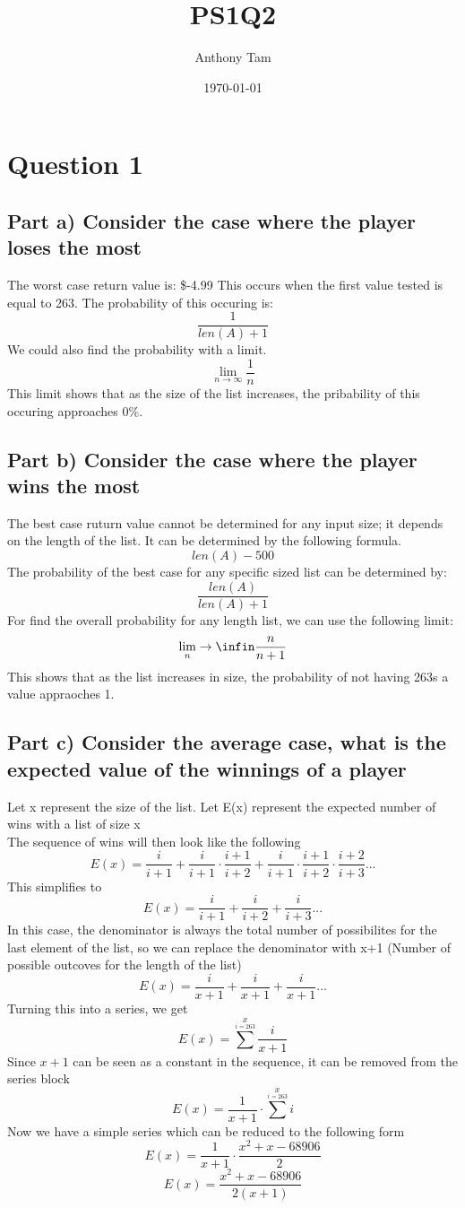 \documentclass[11pt]{article}
\author{Anthony Tam}
\date{\today}
\title{PS1Q2}
\begin{document}
\maketitle
\tableofcontents

\section{Question 1}
\label{sec-1}
\subsection{Part a) Consider the case where the player loses the most}
\label{sec-1-1}
The worst case return value is: \$-4.99
This occurs when the first value tested is equal to 263. The probability of this occuring is:
\[\frac{1}{len(A)+1}\]
We could also find the probability with a limit.
\[\lim_{n\to\infty} \frac{1}{n}\]
This limit shows that as the size of the list increases, the pribability of this occuring approaches 0\%.
\subsection{Part b) Consider the case where the player wins the most}
\label{sec-1-2}
The best case ruturn value cannot be determined for any input size; it depends on the length of the list. It can be determined by the following formula.
\[len(A) - 500\]
The probability of the best case for any specific sized list can be determined by:
\[\frac{len(A)}{len(A) + 1}\]
For find the overall probability for any length list, we can use the following limit:
\[\lim_n\rightarrow\infin \frac{n}{n+1}\]
This shows that as the list increases in size, the probability of not having 263s a value appraoches 1.
\subsection{Part c) Consider the average case, what is the expected value of the winnings of a player}
\label{sec-1-3}
Let x represent the size of the list. Let E(x) represent the expected number of wins with a list of size x\\
   The sequence of wins will then look like the following
\[E(x) = \frac{i}{i+1} + \frac{i}{i+1}\cdot\frac{i+1}{i+2} + \frac{i}{i+1}\cdot\frac{i+1}{i+2}\cdot\frac{i+2}{i+3} ...\]
This simplifies to
\[E(x) = \frac{i}{i+1} + \frac{i}{i+2} + \frac{i}{i+3} ...\]
In this case, the denominator is always the total number of possibilites for the last element of the list, so we can replace the denominator with x+1 (Number of possible outcoves for the length of the list)
\[E(x) = \frac{i}{x+1} + \frac{i}{x+1} + \frac{i}{x+1} ...\]
Turning this into a series, we get
\[E(x) = \sum^{x}\limits_{i=263} \frac{i}{x+1}\]
Since $x+1$ can be seen as a constant in the sequence, it can be removed from the series block
\[E(x) = \frac{1}{x+1}\cdot\sum^{x}\limits_{i=263} i\]
Now we have a simple series which can be reduced to the following form
\[E(x) = \frac{1}{x+1}\cdot\frac{x^2+x-68906}{2}\]
\[E(x) = \frac{x^2+x-68906}{2(x+1)}\]
\end{document}
